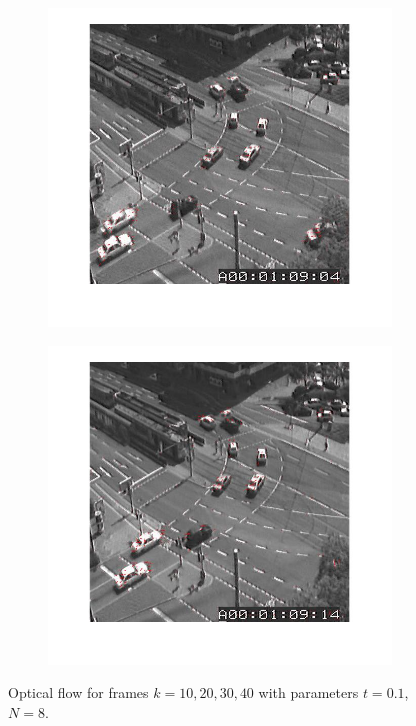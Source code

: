 \documentclass[a4paper]{iacas}
\begin{document}
\begin{figure}[!htbp]
	\begin{subfigure}[b]{0.4\textwidth}
		\includegraphics[width=\textwidth]{409.jpg}
		\caption{}
		\label{fig:409}
	\end{subfigure}
	\begin{subfigure}[b]{0.4\textwidth}
		\includegraphics[width=\textwidth]{410.jpg}
		\caption{}
		\label{fig:410}
	\end{subfigure}
	
	\caption{Optical flow for frames $k=10, 20, 30,40$ with parameters $t=0.1$, $N=8$.}
	\label{fig:400b}
\end{figure}

\AtEndDocument{}
\end{document}
